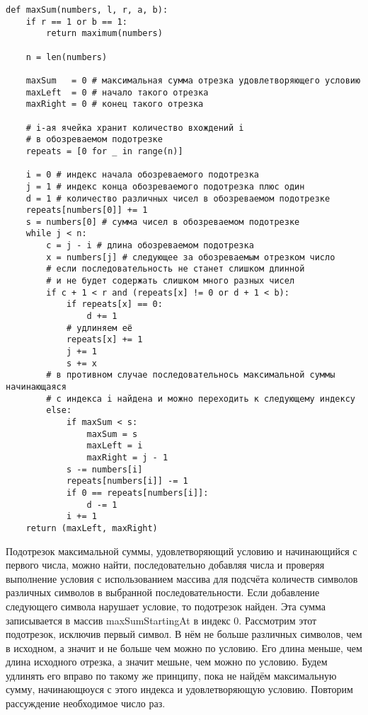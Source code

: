 \documentclass{article}
\begin{document}
\begin{enumerate}
\begin{verbatim}
def maxSum(numbers, l, r, a, b):
    if r == 1 or b == 1:
        return maximum(numbers)

    n = len(numbers)

    maxSum   = 0 # максимальная сумма отрезка удовлетворяющего условию
    maxLeft  = 0 # начало такого отрезка
    maxRight = 0 # конец такого отрезка

    # i-ая ячейка хранит количество вхождений i
    # в обозреваемом подотрезке    
    repeats = [0 for _ in range(n)] 
                                    
    i = 0 # индекс начала обозреваемого подотрезка
    j = 1 # индекс конца обозреваемого подотрезка плюс один
    d = 1 # количество различных чисел в обозреваемом подотрезке
    repeats[numbers[0]] += 1
    s = numbers[0] # сумма чисел в обозреваемом подотрезке
    while j < n:
        c = j - i # длина обозреваемом подотрезка
        x = numbers[j] # следующее за обозреваемым отрезком число
        # если последовательность не станет слишком длинной 
        # и не будет содержать слишком много разных чисел
        if c + 1 < r and (repeats[x] != 0 or d + 1 < b):
            if repeats[x] == 0:
                d += 1
            # удлиняем её
            repeats[x] += 1
            j += 1
            s += x
        # в противном случае последовательнось максимальной суммы начинающаяся
        # с индекса i найдена и можно переходить к следующему индексу
        else: 
            if maxSum < s:
                maxSum = s
                maxLeft = i
                maxRight = j - 1
            s -= numbers[i]
            repeats[numbers[i]] -= 1
            if 0 == repeats[numbers[i]]:
                d -= 1
            i += 1
    return (maxLeft, maxRight)
\end{verbatim}

Подотрезок максимальной суммы, удовлетворяющий условию и начинающийся с первого
числа, можно найти, последовательно добавляя числа и проверяя выполнение
условия с использованием массива для подсчёта количеств символов различных
символов в выбранной последовательности. Если добавление следующего символа
нарушает условие, то подотрезок найден. Эта сумма записывается в массив
maxSumStartingAt в индекс 0. Рассмотрим этот подотрезок, исключив первый
символ. В нём не больше различных символов, чем в исходном, а значит и не
больше чем можно по условию. Его длина меньше, чем длина исходного отрезка, а
значит мешьне, чем можно по условию. Будем удлинять его вправо по такому же
принципу, пока не найдём максимальную сумму, начинающюуся с этого индекса и
удовлетворяющую условию. Повторим рассуждение необходимое число раз.

\end{enumerate}
\end{document}
